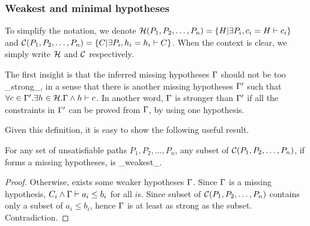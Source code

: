 % 
% 
% 
% 
\subsubsection{Weakest and minimal hypotheses}

To simplify the notation, we denote $\mathcal{H}(P_1, P_2, \dots,
P_n) = \{ H | \exists P_i,c_i = H \vdash c_i\}$ and
$\mathcal{C}(P_1, P_2, \dots, P_n) = \{ C | \exists P_i,h_i = h_i
\vdash C\}$. When the context is clear, we simply write $\mathcal{H}$
and $\mathcal{C}$ respectively.

The first insight is that the inferred missing hypotheses $\Gamma$ should
not be too _strong_, in a sense that there is another missing
hypotheses $\Gamma'$ such that $\forall c\in \Gamma'.\exists h\in \mathcal{H}.
\Gamma \land h \vdash c$. In another word, $\Gamma$ is stronger than $\Gamma'$ if
all the constraints in $\Gamma'$ can be proved from $\Gamma$, by using one
hypothesis.

Given this definition, it is easy to show the following useful result.
%
\begin{Lemma}
For any set of unsatisfiable paths $P_1, P_2, \dots, P_n$, any subset
of $\mathcal{C}(P_1, P_2, \dots, P_n)$, if forms a missing
hypotheses, is _weakest_.
\end{Lemma}
\begin{proof}
Otherwise, exists some weaker hypotheses $\Gamma$. Since $\Gamma$ is a missing
hypothesis, $C_i \land \Gamma\vdash a_i\leq b_i$  for all $i$s. Since
subset of $\mathcal{C}(P_1, P_2, \dots, P_n)$ contains only a
subset of $a_i \leq b_i$, hence $\Gamma$ is at least as strong as the
subset. Contradiction.
\end{proof}

